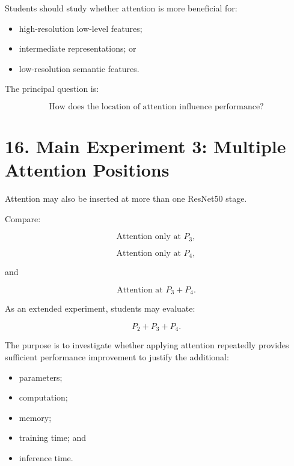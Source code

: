 \documentclass[10pt]{article}
\begin{document}
Students should study whether attention is more beneficial for:

\begin{itemize}

\item high-resolution low-level features;

\item intermediate representations; or

\item low-resolution semantic features.

\end{itemize}

The principal question is:

\[
\boxed{
\text{How does the location of attention influence performance?}
}
\]

\section*{16. Main Experiment 3: Multiple Attention Positions}

Attention may also be inserted at more than one ResNet50 stage.

Compare:

\[
\text{Attention only at }P_3,
\]

\[
\text{Attention only at }P_4,
\]

and

\[
\text{Attention at }P_3+P_4.
\]

As an extended experiment, students may evaluate:

\[
P_2+P_3+P_4.
\]

The purpose is to investigate whether applying attention repeatedly provides
sufficient performance improvement to justify the additional:

\begin{itemize}

\item parameters;

\item computation;

\item memory;

\item training time; and

\item inference time.

\end{itemize}
\end{document}
